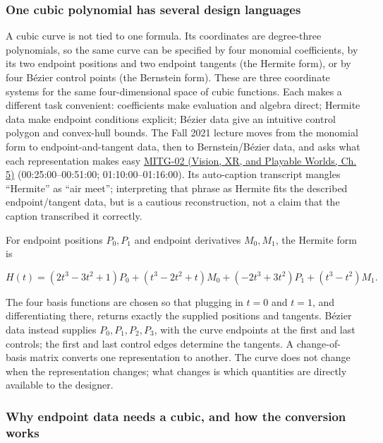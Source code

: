 \subsubsection{One cubic polynomial has several design languages}\label{03-visual-computing-i-ch001-one-cubic-polynomial-has-several-design-languages}

\hypertarget{03-visual-computing-i-ch001-one-cubic-polynomial-has-several-design-languages}{}

A cubic curve is not tied to one formula. Its coordinates are degree-three polynomials, so the same curve can be specified by four monomial coefficients, by its two endpoint positions and two endpoint tangents (the Hermite form), or by four Bézier control points (the Bernstein form). These are three coordinate systems for the same four-dimensional space of cubic functions. Each makes a different task convenient: coefficients make evaluation and algebra direct; Hermite data make endpoint conditions explicit; Bézier data give an intuitive control polygon and convex-hull bounds. The Fall 2021 lecture moves from the monomial form to endpoint-and-tangent data, then to Bernstein/Bézier data, and asks what each representation makes easy \href{../07-Vision-XR-and-Playable-Worlds/main.pdf\#nameddest=04-visual-computing-ii-ch036-mitg-02---cubic-curves}{MITG-02 (Vision, XR, and Playable Worlds, Ch. 5)} (00:25:00--00:51:00; 01:10:00--01:16:00). Its auto-caption transcript mangles ``Hermite'' as ``air meet''; interpreting that phrase as Hermite fits the described endpoint/tangent data, but is a cautious reconstruction, not a claim that the caption transcribed it correctly.

For endpoint positions \(P_0,P_1\) and endpoint derivatives \(M_0,M_1\), the Hermite form is

\[
H(t)=(2t^3-3t^2+1)P_0+(t^3-2t^2+t)M_0+(-2t^3+3t^2)P_1+(t^3-t^2)M_1.
\]

The four basis functions are chosen so that plugging in \(t=0\) and \(t=1\), and differentiating there, returns exactly the supplied positions and tangents. Bézier data instead supplies \(P_0,P_1,P_2,P_3\), with the curve endpoints at the first and last controls; the first and last control edges determine the tangents. A change-of-basis matrix converts one representation to another. The curve does not change when the representation changes; what changes is which quantities are directly available to the designer.

\subsubsection{Why endpoint data needs a cubic, and how the conversion works}\label{03-visual-computing-i-ch001-why-endpoint-data-needs-a-cubic-and-how-the-conversion-works}

